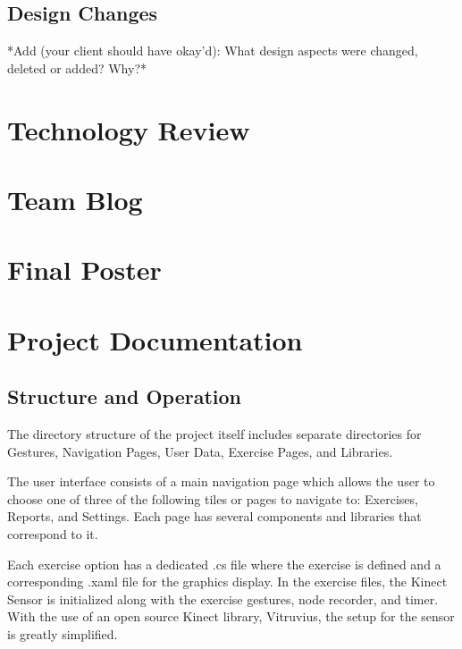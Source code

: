 \documentclass[onecolumn, draftclsnofoot,10pt, compsoc]{IEEEtran}
\begin{document}
\subsection{Design Changes}
*Add (your client should have okay'd): What design aspects were changed, deleted or added? Why?*

\section{Technology Review}


\section{Team Blog}


\section{Final Poster}
  
\section{Project Documentation}
\subsection{Structure and Operation}
The directory structure of the project itself includes separate directories for Gestures, Navigation Pages, User Data, Exercise Pages, and Libraries. 

The user interface consists of a main navigation page which allows the user to choose one of three of the following tiles or pages to navigate to: Exercises, Reports, and Settings. Each page has several components and libraries that correspond to it. 

Each exercise option has a dedicated .cs file where the exercise is defined and a corresponding .xaml file for the graphics display. In the exercise files, the Kinect Sensor is initialized along with the exercise gestures, node recorder, and timer. With the use of an open source Kinect library, Vitruvius, the setup for the sensor is greatly simplified. 
\end{document}

